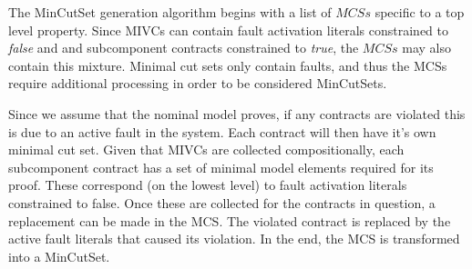 
The MinCutSet generation algorithm begins with a list of $MCSs$ specific to a top level property. Since MIVCs can contain fault activation literals constrained to \textit{false} and and subcomponent contracts constrained to \textit{true}, the $MCSs$ may also contain this mixture. Minimal cut sets only contain faults, and thus the MCSs require additional processing in order to be considered MinCutSets.

Since we assume that the nominal model proves, if any contracts are violated this is due to an active fault in the system. Each contract will then have it's own minimal cut set. Given that MIVCs are collected compositionally, each subcomponent contract has a set of minimal model elements required for its proof. These correspond (on the lowest level) to fault activation literals constrained to false. Once these are collected for the contracts in question, a replacement can be made in the MCS. The violated contract is replaced by the active fault literals that caused its violation. In the end, the MCS is transformed into a MinCutSet.


